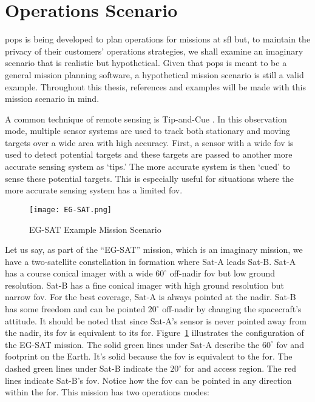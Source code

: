 \section{Operations Scenario}

\gls{pops} is being developed to plan operations for missions at \gls{sfl} but,
to maintain the privacy of their customers' operations strategies, we shall
examine an imaginary scenario that is realistic but hypothetical. Given that
\gls{pops} is meant to be a general mission planning software, a hypothetical
mission scenario is still a valid example. Throughout this thesis, references
and examples will be made with this mission scenario in mind.

A common technique of remote sensing is Tip-and-Cue \cite{}.  In this
observation mode, multiple sensor systems are used to track both stationary and
moving targets over a wide area with high accuracy. First, a sensor with a wide
\gls{fov} is used to detect potential targets and these targets are passed to
another more accurate sensing system as ‘tips.’ The more accurate system is
then ‘cued’ to sense these potential targets. This is especially useful for
situations where the more accurate sensing system has a limited \gls{fov}.

\begin{figure}[h]
    \centering
    \texttt{[image: EG-SAT.png]} 
    \caption{EG-SAT Example Mission Scenario}
    \label{fig:eg-sat-1} 
\end{figure}

Let us say, as part of the “EG-SAT” mission, which is an imaginary mission, we
have a two-satellite constellation in formation where Sat-A leads Sat-B. Sat-A
has a course conical imager with a wide $60^\circ$ off-nadir \gls{fov} but low
ground resolution.  Sat-B has a fine conical imager with high ground resolution
but narrow \gls{fov}.  For the best coverage, Sat-A is always pointed at the
nadir.  Sat-B has some freedom and can be pointed $20^\circ$ off-nadir by
changing the spacecraft’s attitude.  It should be noted that since Sat-A’s
sensor is never pointed away from the nadir, its \gls{fov} is equivalent to its
\gls{for}. Figure~\ref{fig:eg-sat-1} illustrates the configuration of the
EG-SAT mission.  The solid green lines under Sat-A describe the $60^\circ$
\gls{fov} and footprint on the Earth. It's solid because the \gls{fov} is
equivalent to the \gls{for}. The dashed green lines under Sat-B indicate the
$20^\circ$ \gls{for} and access region. The red lines indicate Sat-B's
\gls{fov}. Notice how the \gls{fov} can be pointed in any direction within the
\gls{for}. This mission has two operations modes: 

